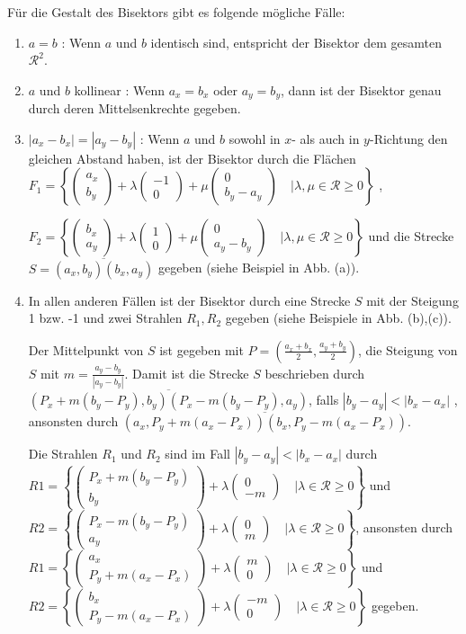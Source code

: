 \documentclass[a4paper]{article}
\newcommand{\vektor}[1]{\left( \begin{array}{c} #1 \end{array} \right) }
\begin{document}
Für die Gestalt des Bisektors gibt es folgende mögliche Fälle:
\begin{enumerate}
	\item $a = b$ : Wenn $a$ und $b$ identisch sind, entspricht der Bisektor dem gesamten $\mathcal{R}^2$.
	\item $a$ und $b$ kollinear : Wenn $a_x = b_x$ oder $a_y = b_y$, dann ist der Bisektor genau durch deren Mittelsenkrechte gegeben. 
	\item $|a_x - b_x| = |a_y - b_y|$ : Wenn $a$ und $b$ sowohl in $x$- als auch in $y$-Richtung 
	den gleichen Abstand haben, ist der Bisektor durch die Flächen 
	$F_1 = \left \{\vektor{a_x \\ b_y} + \lambda \vektor{-1 \\ 0} + \mu \vektor{0 \\ b_y - a_y} \quad |   \lambda, \mu \in \mathcal{R}  \geq 0 \right\}$ , 
	
	$F_2 = \left \{\vektor{b_x \\ a_y} + \lambda \vektor{1 \\ 0} + \mu \vektor{0 \\ a_y - b_y} \quad |   \lambda, \mu \in \mathcal{R}  \geq 0  \right \}$
	und die Strecke
	$S = \overline{(a_x, b_y) (b_x, a_y)}$ gegeben (siehe Beispiel in Abb. (a)). 
	\item In allen anderen Fällen ist der Bisektor durch eine Strecke $S$ mit der Steigung 1 bzw. -1 und
	zwei Strahlen $R_1, R_2$ gegeben (siehe Beispiele in Abb. (b),(c)).
	
	Der Mittelpunkt von $S$ ist gegeben mit $P = (\frac{a_x + b_x}{2}, \frac{a_y + b_y}{2})$, die Steigung von $S$ mit $m = \frac{a_y - b_y}{|a_y - b_y|}$. Damit ist die Strecke $S$ beschrieben durch
	$\overline{(P_x + m (b_y - P_y), b_y) (P_x - m (b_y - P_y), a_y)}$, falls $|b_y - a_y| < |b_x - a_x|$
	, ansonsten durch
	$\overline{(a_x, P_y + m (a_x - P_x)) (b_x, P_y - m (a_x - P_x))}$. 
	
	Die Strahlen $R_1$ und $R_2$ sind im Fall $|b_y - a_y| < |b_x - a_x|$ durch $R1 = \left \{\vektor{P_x + m (b_y - P_y) \\ b_y} + \lambda \vektor{0 \\ -m}   \quad |   \lambda \in \mathcal{R}  \geq 0  \right \}$ und $R2 = \left \{\vektor{P_x - m (b_y - P_y)\\ a_y} + \lambda \vektor{0 \\ m}   \quad |   \lambda \in \mathcal{R}  \geq 0  \right \}$, ansonsten durch $R1 = \left \{\vektor{a_x \\ P_y + m (a_x - P_x)} + \lambda \vektor{m \\ 0}   \quad |   \lambda \in \mathcal{R}  \geq 0  \right \}$ und $R2 = \left \{\vektor{b_x\\ P_y - m (a_x - P_x)} + \lambda \vektor{-m \\ 0}   \quad |   \lambda \in \mathcal{R}  \geq 0  \right \}$ gegeben. 
	
\end{enumerate}
\end{document}
